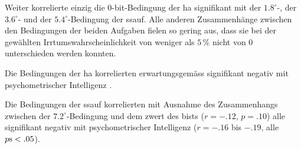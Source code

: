 \documentclass[11pt, twoside, a4paper]{book}		%
\begin{document}
Weiter korrelierte einzig die 0-bit-Bedingung der \gls{ha} signifikant mit der $1.8^{\circ}$-, der $3.6^{\circ}$- und der $5.4^{\circ}$-Bedingung der \gls{ssauf}. Alle anderen Zusammenhänge zwischen den Bedingungen der beiden Aufgaben fielen so gering aus, dass sie bei der gewählten Irrtumswahrscheinlichkeit von weniger als $5\,\%$ nicht von 0 unterschieden werden konnten.

Die Bedingungen der \gls{ha} korrelierten erwartungsgemäss signifikant negativ mit psychometrischer Intelligenz \citep[$r=-.19$ bis $-.28$, alle $p\textnormal{s}<.05$; vgl.][]{Sheppard2008}.

Die Bedingungen der \gls{ssauf} korrelierten mit Ausnahme des Zusammenhangs zwischen der $7.2^{\circ}$-Bedingung und dem \gls{zwert} des \gls{bist}s ($r=-.12$, $p=.10$) alle signifikant negativ mit psychometrischer Intelligenz ($r=-.16$ bis $-.19$, alle $p\textnormal{s}<.05$).
\end{document}
